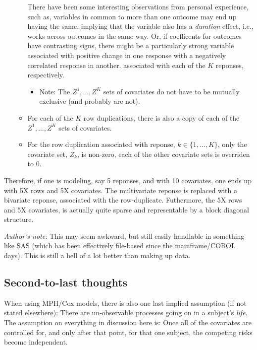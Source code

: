\documentclass[10pt]{article}
\begin{document}
\begin{itemize}
\begin{itemize}
{                There have been some interesting observations from personal experience, such as, variables in
                common to more than one outcome may end up having the same, implying that the variable also has a {\em duration} effect, i.e., works across outcomes in the same
                way. Or, if coefficents for outcomes have contrasting signs, there might be a particularly strong variable associated with
                positive change in one response with a negatively correlated response in another.} associated with each of the
                $K$ reponses, respectively.
                \begin{itemize}
                    \item Note: The $Z^1, \ldots, Z^K$ sets of covariates do not have to be mutually exclusive (and probably are not).
                \end{itemize}
            \item For each of the $K$ row duplications, there is also a copy of each of the $Z^1, \ldots, Z^K$ sets of covariates.
            \item For the row duplication associated with reponse, $k \in \{1, \ldots, K\}$, only the covariate set, $Z_k$, is non-zero,
                each of the other covariate sets is overriden to 0.
        \end{itemize}
\end{itemize}

Therefore, if one is modeling, say 5 reponses, and with 10 covariates, one ends up with 5X rows and 5X covariates.  The multivariate reponse
is replaced with a bivariate reponse, associated with the row-duplicate.  Futhermore, the 5X rows and 5X covariates, is actually quite
sparse and representable by a block diagonal structure.   

{\em Author's note:} This may seem awkward, but still easily handlable in something like SAS (which has been effectively file-based since
the mainframe/COBOL days).  This is still a hell of a lot better than making up data. 


\subsection{Second-to-last thoughts}

When using MPH/Cox models, there is also one last implied assumption (if not stated elsewhere):  There are un-observable processes going
on in a subject's {\em life}.  The assumption on everything in discussion here is:  Once all of the covariates are controlled for, and
only after that point,
for that one subject, the competing risks become independent.  
\end{document}
